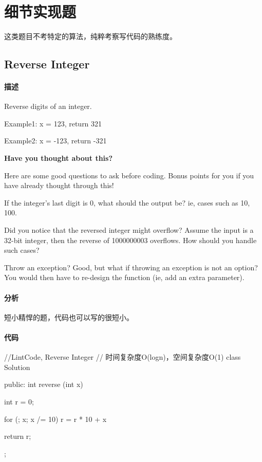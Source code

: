 \chapter{细节实现题}
这类题目不考特定的算法，纯粹考察写代码的熟练度。


\section{Reverse Integer} %
\label{sec:reverse-integer}


\subsubsection{描述}
Reverse digits of an integer.

Example1: x = 123, return 321

Example2: x = -123, return -321


\textbf{Have you thought about this?}

Here are some good questions to ask before coding. Bonus points for you if you have already thought through this!

If the integer's last digit is 0, what should the output be? ie, cases such as 10, 100.

Did you notice that the reversed integer might overflow? Assume the input is a 32-bit integer, then the reverse of 1000000003 overflows. How should you handle such cases?

Throw an exception? Good, but what if throwing an exception is not an option? You would then have to re-design the function (ie, add an extra parameter).


\subsubsection{分析}
短小精悍的题，代码也可以写的很短小。


\subsubsection{代码}
\begin{Code}
//LintCode, Reverse Integer
// 时间复杂度O(logn)，空间复杂度O(1)
class Solution {
public:
    int reverse (int x) {
        int r = 0;

        for (; x; x /= 10)
            r = r * 10 + x %

        return r;
    }
};
\end{Code}


